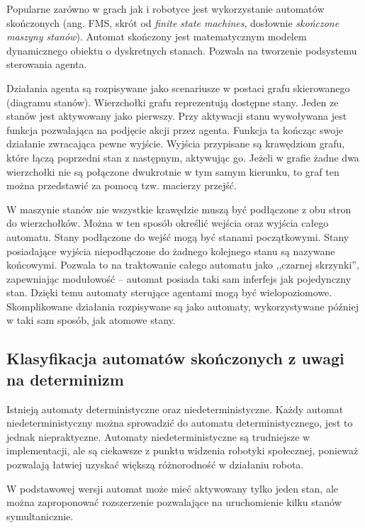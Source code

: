 Popularne zarówno w grach jak i robotyce jest wykorzystanie automatów skończonych (ang. FMS, skrót od \textit{finite state machines}, dosłownie \textit{skończone maszyny stanów}). Automat skończony jest matematycznym modelem dynamicznego obiektu o dyskretnych stanach. Pozwala na tworzenie podsystemu sterowania agenta.~\cite{FOUK}

Działania agenta są rozpisywane jako scenariusze w postaci grafu skierowanego (diagramu stanów). Wierzchołki grafu reprezentują dostępne stany. Jeden ze stanów jest aktywowany jako pierwszy. Przy aktywacji stanu wywoływana jest funkcja pozwalająca na podjęcie akcji przez agenta. Funkcja ta kończąc swoje działanie zwracająca pewne wyjście. Wyjścia przypisane są krawędziom grafu, które łączą poprzedni stan z następnym, aktywując go. Jeżeli w grafie żadne dwa wierzchołki nie są połączone dwukrotnie w tym samym kierunku, to graf ten można przedstawić za pomocą tzw. macierzy przejść.

W maszynie stanów nie wszystkie krawędzie muszą być podłączone z obu stron do wierzchołków. Można w ten sposób określić wejścia oraz wyjścia całego automatu. Stany podłączone do wejść mogą być stanami początkowymi. Stany posiadające wyjścia niepodłączone do żadnego kolejnego stanu są nazywane końcowymi. Pozwala to na traktowanie całego automatu jako ,,czarnej skrzynki'', zapewniając modułowość – automat posiada taki sam inferfejs jak pojedynczny stan. Dzięki temu automaty sterujące agentami mogą być wielopoziomowe. Skomplikowane działania rozpisywane są jako automaty, wykorzystywane później w taki sam sposób, jak atomowe stany.

\subsection{Klasyfikacja automatów skończonych z uwagi na determinizm}

Istnieją automaty deterministyczne oraz niedeterministyczne. Każdy automat niedeterministyczny można sprowadzić do automatu deterministycznego, jest to jednak niepraktyczne. Automaty niedeterministyczne są trudniejsze w implementacji, ale są ciekawsze z punktu widzenia robotyki społecznej, ponieważ pozwalają łatwiej uzyskać większą różnorodność w działaniu robota.

W podstawowej wersji automat może mieć aktywowany tylko jeden stan, ale można zaproponować rozszerzenie pozwalające na uruchomienie kilku stanów symultanicznie. %

